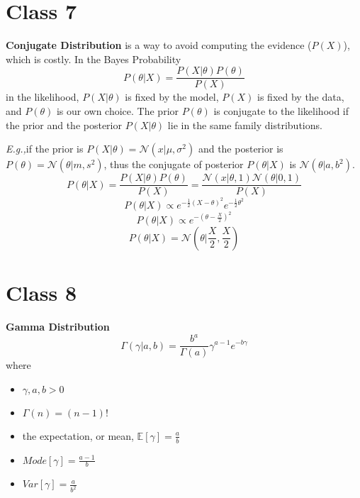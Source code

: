 \documentclass{article}
\newcommand{\Eg}{\textit{E.g.,}}
\begin{document}
\section{Class 7}
\textbf{Conjugate Distribution} is a way to avoid computing the evidence ($P(X)$), which is costly. In the Bayes Probability
\begin{equation}
    P(\theta|X) = \frac{P(X|\theta)P(\theta)}{P(X)}
\end{equation}
in the likelihood, $P(X|\theta)$ is fixed by the model, $P(X)$ is fixed by the data, and $P(\theta)$ is our own choice. The prior $P(\theta)$ is conjugate to the likelihood if the prior and the posterior $P(X|\theta)$ lie in the same family distributions. 

\Eg if the prior is $P(X|\theta) = \mathcal{N}(x|\mu, \sigma^2)$ and the posterior is $P(\theta) = \mathcal{N}(\theta|m, s^2)$, thus the conjugate of posterior $P(\theta|X)$ is $\mathcal{N}(\theta|a, b^2)$.
\begin{equation}
    P(\theta|X) = \frac{P(X|\theta)P(\theta)}{P(X)} = \frac{\mathcal{N}(x|\theta, 1) \mathcal{N}(\theta|0, 1)}{P(X)}
\end{equation}
\begin{equation}
    P(\theta|X) \propto e^{-\frac{1}{2}(X - \theta)^2} e^{-\frac{1}{2}\theta^2}
\end{equation}
\begin{equation}
    P(\theta|X) \propto e^{-(\theta - \frac{X}{2})^2}
\end{equation}
\begin{equation}
    P(\theta|X) = \mathcal{N}(\theta|\frac{X}{2}, \frac{X}{2})
\end{equation}

\section{Class 8}

\textbf{Gamma Distribution}
\begin{equation}
    \Gamma(\gamma|a, b) = \frac{b^a}{\Gamma(a)} \gamma^{a-1}e^{-b\gamma}
\end{equation}
where \begin{itemize}
    \item $\gamma, a, b > 0$
    \item $\Gamma(n) = (n - 1)!$
    \item the expectation, or mean, $\mathbb{E}[\gamma] = \frac{a}{b}$
    \item $Mode[\gamma] = \frac{a-1}{b}$
    \item $Var[\gamma] = \frac{a}{b^2}$
\end{itemize}
\end{document}
